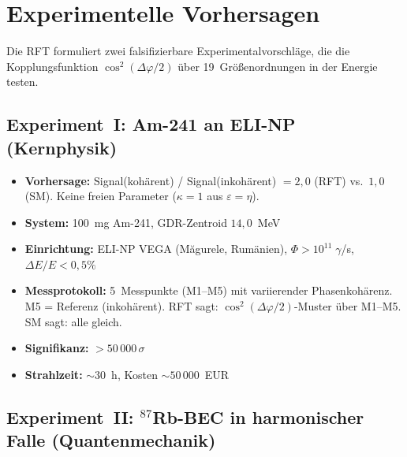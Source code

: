 \documentclass[a4paper,11pt]{article}
\begin{document}
	\section{Experimentelle Vorhersagen}
	
	Die RFT formuliert zwei falsifizierbare Experimentalvorschl\"age,
	die die Kopplungsfunktion $\cos^2(\Delta\varphi/2)$ \"uber
	19~Gr\"o\ss{}enordnungen in der Energie testen.
	
	\subsection{Experiment~I: Am-241 an ELI-NP (Kernphysik)}
	
	\begin{itemize}
		\item \textbf{Vorhersage:}
		Signal(koh\"arent) / Signal(inkoh\"arent) $= 2{,}0$
		(RFT) vs.\ $1{,}0$ (SM). Keine freien Parameter
		($\kappa = 1$ aus $\varepsilon = \eta$).
		\item \textbf{System:} 100~mg Am-241,
		GDR-Zentroid $14{,}0$~MeV
		\item \textbf{Einrichtung:} ELI-NP VEGA
		(M\u{a}gurele, Rum\"anien),
		$\Phi > 10^{11}\;\gamma$/s,
		$\Delta E/E < 0{,}5\%$
		\item \textbf{Messprotokoll:} 5~Messpunkte (M1--M5)
		mit variierender Phasenkoh\"arenz. M5 = Referenz
		(inkoh\"arent). RFT sagt:
		$\cos^2(\Delta\varphi/2)$-Muster \"uber M1--M5.
		SM sagt: alle gleich.
		\item \textbf{Signifikanz:} $> 50\,000\,\sigma$
		\item \textbf{Strahlzeit:} ${\sim}30$~h,
		Kosten ${\sim}50\,000$~EUR
	\end{itemize}
	
	\subsection{Experiment~II: ${}^{87}$Rb-BEC in harmonischer
		Falle (Quantenmechanik)}
	
\end{document}
